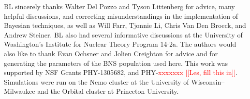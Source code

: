 \documentclass[twocolumn,prd,amssymb,aps,nofootinbib,showpacs,epsf]{revtex4}
\newcommand{\red}{\textcolor{red}}
\begin{document}
\acknowledgements

BL sincerely thanks Walter Del Pozzo and Tyson Littenberg for advice, many helpful discussions, and correcting misunderstandings in the implementation of Bayesian techniques, as well as Will Farr, Tjonnie Li, Chris Van Den Broeck, and Andrew Steiner. BL also had several informative discussions at the University of Washington's Institute for Nuclear Theory Program 14-2a. The authors would also like to thank Evan Ochsner and Jolien Creighton for advice and for generating the parameters of the BNS population used here. This work was supported by NSF Grants PHY-1305682, and PHY-\red{xxxxxxx [[Les, fill this in]]}. Simulations were run on the Nemo cluster at the University of Wisconsin--Milwaukee and the Orbital cluster at Princeton University.


\end{document}
